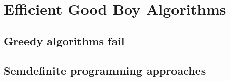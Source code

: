 \chapter{Efficient Good Boy Algorithms} \label{chapter:algorithms}


\section{Greedy algorithms fail}

\blindtext

\section{Semdefinite programming approaches}

\Blindtext